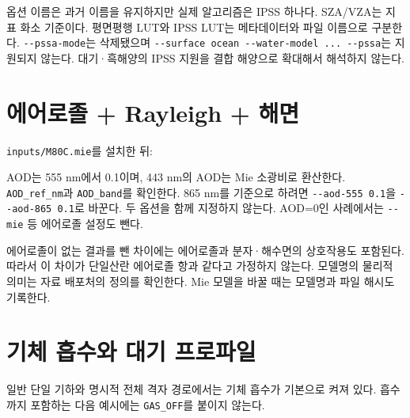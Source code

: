 옵션 이름은 과거 이름을 유지하지만 실제 알고리즘은 IPSS 하나다. SZA/VZA는 지표 화소 기준이다. 평면평행 LUT와 IPSS LUT는 메타데이터와 파일 이름으로 구분한다. \texttt{-\allowbreak{}-\allowbreak{}pssa-\allowbreak{}mode}는 삭제됐으며 \texttt{-\allowbreak{}-\allowbreak{}surface ocean -\allowbreak{}-\allowbreak{}water-\allowbreak{}model .\allowbreak{}.\allowbreak{}.\allowbreak{} -\allowbreak{}-\allowbreak{}pssa}는 지원되지 않는다. 대기·흑해양의 IPSS 지원을 결합 해양으로 확대해서 해석하지 않는다.

\section{에어로졸 + Rayleigh + 해면}
\label{sec:auto:04_examples:5}
\texttt{inputs/\allowbreak{}M80C.\allowbreak{}mie}를 설치한 뒤:


\par\noindent\begin{minipage}{\linewidth}
\end{minipage}\par

AOD는 555 nm에서 0.1이며, 443 nm의 AOD는 Mie 소광비로 환산한다. \texttt{AOD\_\allowbreak{}ref\_\allowbreak{}nm}과 \texttt{AOD\_\allowbreak{}band}를 확인한다. 865 nm를 기준으로 하려면 \texttt{-\allowbreak{}-\allowbreak{}aod-\allowbreak{}555 0.\allowbreak{}1}을 \texttt{-\allowbreak{}-\allowbreak{}aod-\allowbreak{}865 0.\allowbreak{}1}로 바꾼다. 두 옵션을 함께 지정하지 않는다. AOD=0인 사례에서는 \texttt{-\allowbreak{}-\allowbreak{}mie} 등 에어로졸 설정도 뺀다.

에어로졸이 없는 결과를 뺀 차이에는 에어로졸과 분자·해수면의 상호작용도 포함된다. 따라서 이 차이가 단일산란 에어로졸 항과 같다고 가정하지 않는다. 모델명의 물리적 의미는 자료 배포처의 정의를 확인한다. Mie 모델을 바꿀 때는 모델명과 파일 해시도 기록한다.

\section{기체 흡수와 대기 프로파일}
\label{sec:auto:04_examples:6}
일반 단일 기하와 명시적 전체 격자 경로에서는 기체 흡수가 기본으로 켜져 있다. 흡수까지 포함하는 다음 예시에는 \texttt{GAS\_\allowbreak{}OFF}를 붙이지 않는다.


